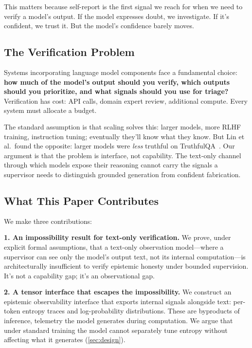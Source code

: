 \documentclass[11pt]{article}
\begin{document}
This matters because self-report is the first signal we reach for when we need to verify a model's output. If the model expresses doubt, we investigate. If it's confident, we trust it. But the model's confidence barely moves.

\subsection{The Verification Problem}

Systems incorporating language model components face a fundamental choice: \textbf{how much of the model's output should you verify, which outputs should you prioritize, and what signals should you use for triage?} Verification has cost: API calls, domain expert review, additional compute. Every system must allocate a budget.

The standard assumption is that scaling solves this: larger models, more RLHF training, instruction tuning; eventually they'll know what they know. But Lin et al.\ found the opposite: larger models were \emph{less} truthful on TruthfulQA~\citep{lin2022truthfulqa}. Our argument is that the problem is interface, not capability. The text-only channel through which models expose their reasoning cannot carry the signals a supervisor needs to distinguish grounded generation from confident fabrication.

\subsection{What This Paper Contributes}

We make three contributions:

\textbf{1. An impossibility result for text-only verification.} We prove, under explicit formal assumptions, that a text-only observation model---where a supervisor can see only the model's output text, not its internal computation---is architecturally insufficient to verify epistemic honesty under bounded supervision. It's not a capability gap; it's an observational gap.

\textbf{2. A tensor interface that escapes the impossibility.} We construct an epistemic observability interface that exports internal signals alongside text: per-token entropy traces and log-probability distributions. These are byproducts of inference, telemetry the model generates during computation. We argue that under standard training the model cannot separately tune entropy without affecting what it generates (\autoref{sec:design}).
\end{document}
